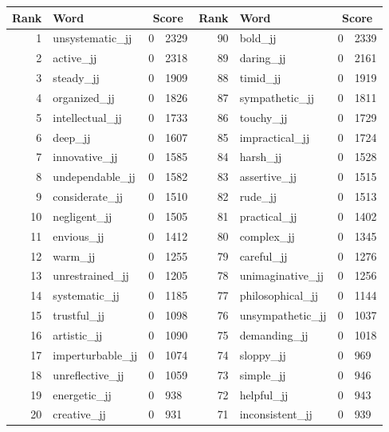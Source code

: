 \begin{table}[tbp]
    \begin{tabular}{| rlr@{.}l | rlr@{.}l |}
    \hline
    \textbf{Rank} & \textbf{Word} & \multicolumn{2}{c|}{\textbf{Score}} & \textbf{Rank} & \textbf{Word} & \multicolumn{2}{c|}{\textbf{Score}} \\
    \hline
    1 & unsystematic\_jj & 0 & 2329    &    90 & bold\_jj & 0 & 2339 \\
    2 & active\_jj & 0 & 2318    &    89 & daring\_jj & 0 & 2161 \\
    3 & steady\_jj & 0 & 1909    &    88 & timid\_jj & 0 & 1919 \\
    4 & organized\_jj & 0 & 1826    &    87 & sympathetic\_jj & 0 & 1811 \\
    5 & intellectual\_jj & 0 & 1733    &    86 & touchy\_jj & 0 & 1729 \\
    6 & deep\_jj & 0 & 1607    &    85 & impractical\_jj & 0 & 1724 \\
    7 & innovative\_jj & 0 & 1585    &    84 & harsh\_jj & 0 & 1528 \\
    8 & undependable\_jj & 0 & 1582    &    83 & assertive\_jj & 0 & 1515 \\
    9 & considerate\_jj & 0 & 1510    &    82 & rude\_jj & 0 & 1513 \\
    10 & negligent\_jj & 0 & 1505    &    81 & practical\_jj & 0 & 1402 \\
    11 & envious\_jj & 0 & 1412    &    80 & complex\_jj & 0 & 1345 \\
    12 & warm\_jj & 0 & 1255    &    79 & careful\_jj & 0 & 1276 \\
    13 & unrestrained\_jj & 0 & 1205    &    78 & unimaginative\_jj & 0 & 1256 \\
    14 & systematic\_jj & 0 & 1185    &    77 & philosophical\_jj & 0 & 1144 \\
    15 & trustful\_jj & 0 & 1098    &    76 & unsympathetic\_jj & 0 & 1037 \\
    16 & artistic\_jj & 0 & 1090    &    75 & demanding\_jj & 0 & 1018 \\
    17 & imperturbable\_jj & 0 & 1074    &    74 & sloppy\_jj & 0 & 969 \\
    18 & unreflective\_jj & 0 & 1059    &    73 & simple\_jj & 0 & 946 \\
    19 & energetic\_jj & 0 & 938    &    72 & helpful\_jj & 0 & 943 \\
    20 & creative\_jj & 0 & 931    &    71 & inconsistent\_jj & 0 & 939 \\

\end{tabular}
\end{table}
